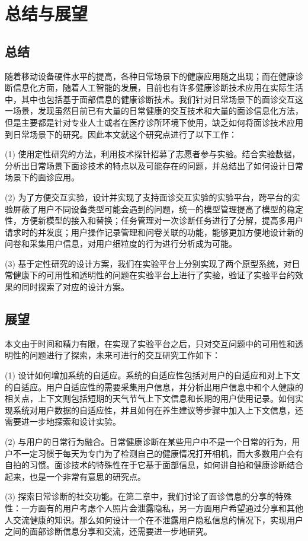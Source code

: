 \chapter{总结与展望}
\section{总结}
随着移动设备硬件水平的提高，各种日常场景下的健康应用随之出现；而在健康诊断信息化方面，随着人工智能的发展，目前也有许多健康诊断技术应用在实际生活中，其中也包括基于面部信息的健康诊断技术。我们针对日常场景下的面诊交互这一场景，发现虽然目前已有大量的日常健康的交互技术和大量的面诊信息化方法，但是主要都是针对专业人士或者在医疗诊所环境下使用，缺乏如何将面诊技术应用到日常场景下的研究。因此本文就这个研究点进行了以下工作：

(1) 使用定性研究的方法，利用技术探针招募了志愿者参与实验。结合实验数据，分析出日常场景下面诊技术的特点以及可能存在的问题，并总结出了如何设计日常场景下的面诊应用。

(2) 为了方便交互实验，设计并实现了支持面诊交互实验的实验平台，跨平台的实验屏蔽了用户不同设备类型可能会遇到的问题，统一的模型管理提高了模型的稳定性，方便新模型的接入和替换；任务管理对一次诊断任务进行了分解，提高多用户请求时的并发度；用户操作记录管理和问卷关联的功能，能够更加方便地设计新的问卷和采集用户信息，对用户细粒度的行为进行分析成为可能。

(3) 基于定性研究的设计方案，我们在实验平台上分别实现了两个原型系统，对日常健康下的可用性和透明性的问题在实验平台上进行了实验，验证了实验平台的效果的同时探索了对应的设计方案。



\section{展望}
本文由于时间和精力有限，在实现了实验平台之后，只对交互问题中的可用性和透明性的问题进行了探索，未来可进行的交互研究工作如下：

(1) 设计如何增加系统的自适应。系统的自适应性包括对用户的自适应和对上下文的自适应。用户自适应性的需要采集用户信息，并分析出用户信息中和个人健康的相关点，上下文则包括短期的天气节气上下文信息和长期的用户使用记录。如何实现系统对用户数据的自适应性，并且如何在养生建议等步骤中加入上下文信息，还需要进一步地探索和设计实验。

(2) 与用户的日常行为融合。日常健康诊断在某些用户中不是一个日常的行为，用户不一定习惯于每天为专门为了检测自己的健康情况打开相机，而大多数用户会有自拍的习惯。面诊技术的特殊性在于它基于面部信息，如何讲自拍和健康诊断结合起来，也是一个非常有意思的研究点。

(3) 探索日常诊断的社交功能。在第二章中，我们讨论了面诊信息的分享的特殊性：一方面有的用户考虑个人照片会泄露隐私，另一方面用户希望通过分享和其他人交流健康的知识。那么如何设计一个在不泄露用户隐私信息的情况下，实现用户之间的面部诊断信息分享和交流，还需要进一步地研究。

